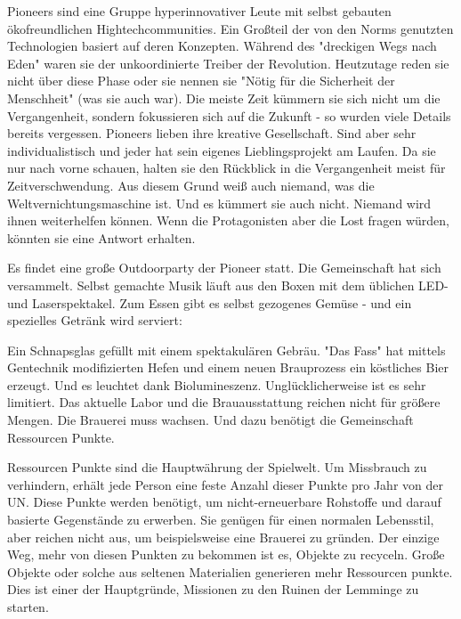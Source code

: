 \begin{sidebarBox}[title=Pioneers]
Pioneers sind eine Gruppe hyperinnovativer Leute mit selbst gebauten ökofreundlichen Hightechcommunities. Ein Großteil der von den Norms genutzten Technologien basiert auf deren Konzepten. Während des "dreckigen Wegs nach Eden" waren sie der unkoordinierte Treiber der Revolution. Heutzutage reden sie nicht über diese Phase oder sie nennen sie "Nötig für die Sicherheit der Menschheit" (was sie auch war). Die meiste Zeit kümmern sie sich nicht um die Vergangenheit, sondern fokussieren sich auf die Zukunft - so wurden viele Details bereits vergessen. Pioneers lieben ihre kreative Gesellschaft. Sind aber sehr individualistisch und jeder hat sein eigenes Lieblingsprojekt am Laufen. Da sie nur nach vorne schauen, halten sie den Rückblick in die Vergangenheit meist für Zeitverschwendung. Aus diesem Grund weiß auch niemand, was die Weltvernichtungsmaschine ist. Und es kümmert sie auch nicht. Niemand wird ihnen weiterhelfen können. Wenn die Protagonisten aber die Lost fragen würden, könnten sie eine Antwort erhalten.
\end{sidebarBox}

Es findet eine große Outdoorparty der Pioneer statt. Die Gemeinschaft hat sich versammelt. Selbst gemachte Musik läuft aus den Boxen mit dem üblichen LED- und Laserspektakel. Zum Essen gibt es selbst gezogenes Gemüse - und ein spezielles Getränk wird serviert:

Ein Schnapsglas gefüllt mit einem spektakulären Gebräu. "Das Fass" hat mittels Gentechnik modifizierten Hefen und einem neuen Brauprozess ein köstliches Bier erzeugt. Und es leuchtet dank Biolumineszenz. Unglücklicherweise ist es sehr limitiert. Das aktuelle Labor und die Brauausstattung reichen nicht für größere Mengen. Die Brauerei muss wachsen. Und dazu benötigt die Gemeinschaft Ressourcen Punkte.

\begin{sidebarBox}[title=Ressourcen Punkte]
Ressourcen Punkte sind die Hauptwährung der Spielwelt. Um Missbrauch zu verhindern, erhält jede Person eine feste Anzahl dieser Punkte pro Jahr von der UN. Diese Punkte werden benötigt, um nicht-erneuerbare Rohstoffe und darauf basierte Gegenstände zu erwerben. Sie genügen für einen normalen Lebensstil, aber reichen nicht aus, um beispielsweise eine Brauerei zu gründen. Der einzige Weg, mehr von diesen Punkten zu bekommen ist es, Objekte zu recyceln. Große Objekte oder solche aus seltenen Materialien generieren mehr Ressourcen punkte. Dies ist einer der Hauptgründe, Missionen zu den Ruinen der Lemminge zu starten.
\end{sidebarBox}

